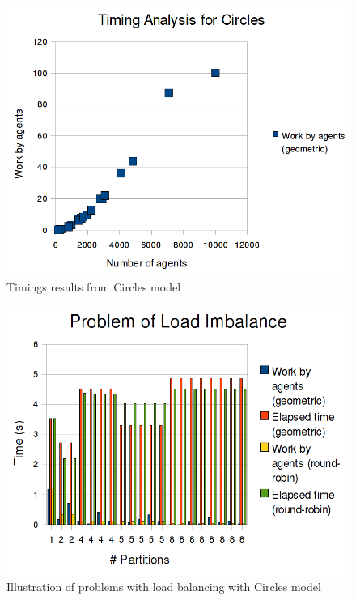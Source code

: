 \begin{figure}[h]
 \centering
  \includegraphics[scale=0.30]{circles-timings.png}
 \caption{Timings results from Circles model}
 \label{fig:circle_timings}
\end{figure}

\begin{figure}[h]
 \centering
  \includegraphics[scale=0.30]{timings-problems.png}
 \caption{Illustration of problems with load balancing with Circles model}
 \label{fig:timings_problems}
\end{figure}

